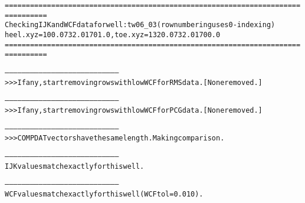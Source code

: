 \begin{alltt}
================================================================================
Checking IJK and WCF data for well: tw06_03 (row numbering uses 0-indexing)
heel.xyz = 100.0 732.0 1701.0, toe.xyz = 1320.0 732.0 1700.0
================================================================================

--------------------------------------------------------------------------------
>>> If any, start removing rows with low WCF for RMS data. [None removed.]

--------------------------------------------------------------------------------
>>> If any, start removing rows with low WCF for PCG data. [None removed.]

--------------------------------------------------------------------------------
>>> COMPDAT vectors have the same length. Making comparison.

--------------------------------------------------------------------------------
IJK values match exactly for this well.

--------------------------------------------------------------------------------
WCF values match exactly for this well (WCF tol = 0.010).
\end{alltt}
